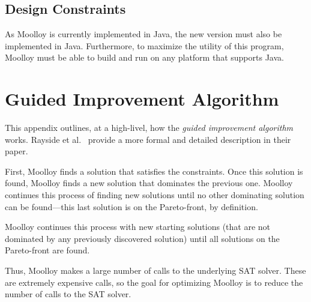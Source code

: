 \documentclass[11pt]{article}
\theoremstyle{definition}
\begin{document}
\subsection{Design Constraints}\label{sec:constraints}

As Moolloy is currently implemented in Java, the new version must also
be implemented in Java. Furthermore, to maximize the utility of this
program, Moolloy must be able to build and run on any platform that
supports Java.

\appendix

\section{Guided Improvement Algorithm}\label{app:impl}

This appendix outlines, at a high-livel, how the \textit{guided
improvement algorithm} works. Rayside et al.~\cite{ref:Rayside09}
provide a more formal and detailed description in their paper.

First, Moolloy finds a solution that satisfies the constraints. Once
this solution is found, Moolloy finds a new solution that dominates the
previous one. Moolloy continues this process of finding new solutions
until no other dominating solution can be found---this last solution is
on the Pareto-front, by definition.

Moolloy continues this process with new starting solutions (that are
not dominated by any previously discovered solution) until all
solutions on the Pareto-front are found.

Thus, Moolloy makes a large number of calls to the underlying SAT
solver. These are extremely expensive calls, so the goal for optimizing
Moolloy is to reduce the number of calls to the SAT solver.



\printbibliography[heading=bibintoc]
\end{document}
